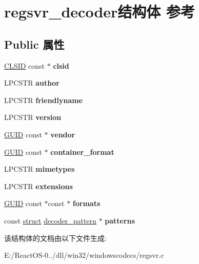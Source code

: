 \hypertarget{structregsvr__decoder}{}\section{regsvr\+\_\+decoder结构体 参考}
\label{structregsvr__decoder}
\subsection*{Public 属性}
\begin{DoxyCompactItemize}
\item 
\mbox{\label{structregsvr__decoder_ab0d3cf75d100a4919e017fde7c422d65}} 
\hyperlink{struct___i_i_d}{C\+L\+S\+ID} const  $\ast$ {\bfseries clsid}
\item 
\mbox{\label{structregsvr__decoder_a9cf9e509ba8cf9aa7701bd57f607d3ea}} 
L\+P\+C\+S\+TR {\bfseries author}
\item 
\mbox{\label{structregsvr__decoder_a36b04c40a54a36e233e403fab0d0b175}} 
L\+P\+C\+S\+TR {\bfseries friendlyname}
\item 
\mbox{\label{structregsvr__decoder_a233d646f0c2c72fd043794c901cf93a2}} 
L\+P\+C\+S\+TR {\bfseries version}
\item 
\mbox{\label{structregsvr__decoder_a63e7750f0f0166d8633066c6a9af3577}} 
\hyperlink{interface_g_u_i_d}{G\+U\+ID} const  $\ast$ {\bfseries vendor}
\item 
\mbox{\label{structregsvr__decoder_a97abfbff14b6ac0aaf568aca46cb0683}} 
\hyperlink{interface_g_u_i_d}{G\+U\+ID} const  $\ast$ {\bfseries container\+\_\+format}
\item 
\mbox{\label{structregsvr__decoder_a3b2d91ab36940cf2bffb717e71565b78}} 
L\+P\+C\+S\+TR {\bfseries mimetypes}
\item 
\mbox{\label{structregsvr__decoder_a8414c6f3c7d4b63b5302a6c34949a53e}} 
L\+P\+C\+S\+TR {\bfseries extensions}
\item 
\mbox{\label{structregsvr__decoder_a7a15a960717bbc37a89c56371d557d8b}} 
\hyperlink{interface_g_u_i_d}{G\+U\+ID} const  $\ast$const  $\ast$ {\bfseries formats}
\item 
\mbox{\label{structregsvr__decoder_af3d4fb1f1c1768ffafd02196fe1bb1ae}} 
const \hyperlink{interfacestruct}{struct} \hyperlink{structdecoder__pattern}{decoder\+\_\+pattern} $\ast$ {\bfseries patterns}
\end{DoxyCompactItemize}


该结构体的文档由以下文件生成\+:\begin{DoxyCompactItemize}
\item 
E\+:/\+React\+O\+S-\/0../dll/win32/windowscodecs/regsvr.\+c\end{DoxyCompactItemize}

